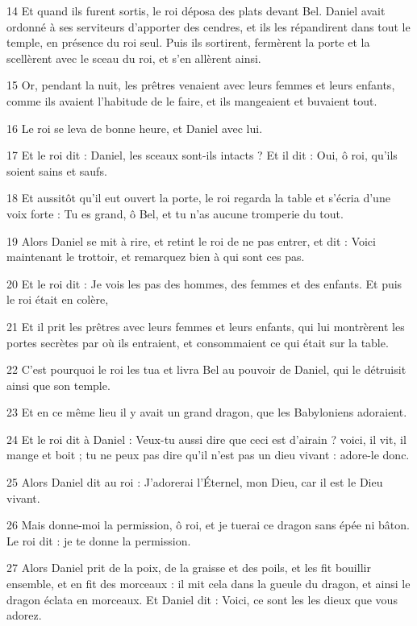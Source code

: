 \par 14 Et quand ils furent sortis, le roi déposa des plats devant Bel. Daniel avait ordonné à ses serviteurs d'apporter des cendres, et ils les répandirent dans tout le temple, en présence du roi seul. Puis ils sortirent, fermèrent la porte et la scellèrent avec le sceau du roi, et s'en allèrent ainsi.
\par 15 Or, pendant la nuit, les prêtres venaient avec leurs femmes et leurs enfants, comme ils avaient l'habitude de le faire, et ils mangeaient et buvaient tout.
\par 16 Le roi se leva de bonne heure, et Daniel avec lui.
\par 17 Et le roi dit : Daniel, les sceaux sont-ils intacts ? Et il dit : Oui, ô roi, qu'ils soient sains et saufs.
\par 18 Et aussitôt qu'il eut ouvert la porte, le roi regarda la table et s'écria d'une voix forte : Tu es grand, ô Bel, et tu n'as aucune tromperie du tout.
\par 19 Alors Daniel se mit à rire, et retint le roi de ne pas entrer, et dit : Voici maintenant le trottoir, et remarquez bien à qui sont ces pas.
\par 20 Et le roi dit : Je vois les pas des hommes, des femmes et des enfants. Et puis le roi était en colère,
\par 21 Et il prit les prêtres avec leurs femmes et leurs enfants, qui lui montrèrent les portes secrètes par où ils entraient, et consommaient ce qui était sur la table.
\par 22 C'est pourquoi le roi les tua et livra Bel au pouvoir de Daniel, qui le détruisit ainsi que son temple.
\par 23 Et en ce même lieu il y avait un grand dragon, que les Babyloniens adoraient.
\par 24 Et le roi dit à Daniel : Veux-tu aussi dire que ceci est d'airain ? voici, il vit, il mange et boit ; tu ne peux pas dire qu'il n'est pas un dieu vivant : adore-le donc.
\par 25 Alors Daniel dit au roi : J'adorerai l'Éternel, mon Dieu, car il est le Dieu vivant.
\par 26 Mais donne-moi la permission, ô roi, et je tuerai ce dragon sans épée ni bâton. Le roi dit : je te donne la permission.
\par 27 Alors Daniel prit de la poix, de la graisse et des poils, et les fit bouillir ensemble, et en fit des morceaux : il mit cela dans la gueule du dragon, et ainsi le dragon éclata en morceaux. Et Daniel dit : Voici, ce sont les les dieux que vous adorez.
